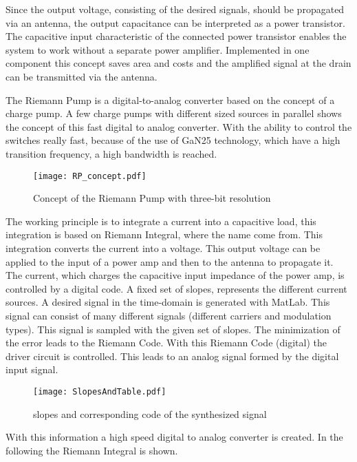 Since the output voltage, consisting of the desired signals, should be propagated via an antenna, the output capacitance can be interpreted as a power transistor.
The capacitive input characteristic of the connected power transistor enables the system to work without a separate power amplifier.
Implemented in one component this concept saves area and costs and the amplified signal at the drain can be transmitted via the antenna.


The Riemann Pump is a digital-to-analog converter based on the concept of a charge pump. A few charge pumps with different sized sources in parallel shows the concept of this fast digital to analog converter. With the ability to control the switches really fast, because of the use of GaN25 technology, which have a high transition frequency, a high bandwidth is reached.

\begin{figure}[ht]
	\centering
  \texttt{[image: RP\_concept.pdf]}
	\caption{Concept of the Riemann Pump with three-bit resolution}
	\label{fig:RiemannPumpConcept}
\end{figure}

 The working principle is to integrate a current into a capacitive load, this integration is based on Riemann Integral, where the name come from. This integration converts the current into a voltage. This output voltage can be applied to the input of a power amp and then to the antenna to propagate it. The current, which charges the capacitive input impedance of the power amp, is controlled by a digital code. A fixed set of slopes, represents the different current sources. A desired signal in the time-domain is generated with MatLab. This signal can consist of many different signals (different carriers and modulation types). This signal is sampled with the given set of slopes. The minimization of the error leads to the Riemann Code. With this Riemann Code (digital) the driver circuit is controlled. This leads to an analog signal formed by the digital input signal. 
 
\begin{figure}[ht]
	\centering
  \texttt{[image: SlopesAndTable.pdf]}
	\caption{slopes and corresponding code of the synthesized signal}
	\label{fig:SlopesAndTable}
\end{figure}

With this information a high speed digital to analog converter is created. In the following the Riemann Integral is shown.


